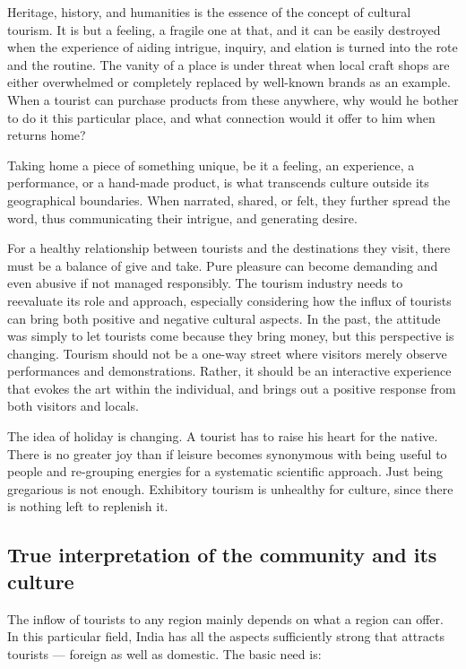 Heritage, history, and humanities is the essence of the concept of cultural tourism. It is but a feeling, a fragile one at that, and it can be easily destroyed when the experience of aiding intrigue, inquiry, and elation is turned into the rote and the routine. The vanity of a place is under threat when local craft shops are either overwhelmed or completely replaced by well-known brands as an example. When a tourist can purchase products from these anywhere, why would he bother to do it this particular place, and what connection would it offer to him when returns home?

Taking home a piece of something unique, be it a feeling, an experience, a performance, or a hand-made product, is what transcends culture outside its geographical boundaries. When narrated, shared, or felt, they further spread the word, thus communicating their intrigue, and generating desire.

For a healthy relationship between tourists and the destinations they visit, there must be a balance of give and take. Pure pleasure can become demanding and even abusive if not managed responsibly. The tourism industry needs to reevaluate its role and approach, especially considering how the influx of tourists can bring both positive and negative cultural aspects. In the past, the attitude was simply to let tourists come because they bring money, but this perspective is changing. Tourism should not be a one-way street where visitors merely observe performances and demonstrations. Rather, it should be an interactive experience that evokes the art within the individual, and brings out a positive response from both visitors and locals.

The idea of holiday is changing. A tourist has to raise his heart for the native. There is no greater joy than if leisure becomes synonymous with being useful to people and re-grouping energies for a systematic scientific approach. Just being gregarious is not enough. Exhibitory tourism is unhealthy for culture, since there is nothing left to replenish it.


\subsection{True interpretation of the community and its culture} %
\label{sub:tic}

The inflow of tourists to any region mainly depends on what a region can offer. In this particular field, India has all the aspects sufficiently strong that attracts tourists --- foreign as well as domestic. The basic need is:

